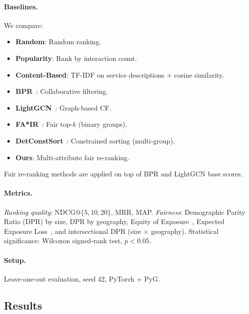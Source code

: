 \documentclass[sigconf,natbib=true]{acmart}
\begin{document}
\paragraph{Baselines.} We compare:
\begin{itemize}
    \item \textbf{Random}: Random ranking.
    \item \textbf{Popularity}: Rank by interaction count.
    \item \textbf{Content-Based}: TF-IDF on service descriptions + cosine similarity.
    \item \textbf{BPR}~\cite{rendle2009bpr}: Collaborative filtering.
    \item \textbf{LightGCN}~\cite{he2020lightgcn}: Graph-based CF.
    \item \textbf{FA*IR}~\cite{zehlike2017fair}: Fair top-$k$ (binary groups).
    \item \textbf{DetConstSort}~\cite{geyik2019fairness}: Constrained sorting (multi-group).
    \item \textbf{Ours}: Multi-attribute fair re-ranking.
\end{itemize}

Fair re-ranking methods are applied on top of BPR and LightGCN base scores.

\paragraph{Metrics.} \emph{Ranking quality}: NDCG@$\{5,10,20\}$, MRR, MAP. \emph{Fairness}: Demographic Parity Ratio (DPR) by size, DPR by geography, Equity of Exposure~\cite{diaz2020evaluating}, Expected Exposure Loss~\cite{singh2018fairness}, and intersectional DPR (size $\times$ geography). Statistical significance: Wilcoxon signed-rank test, $p < 0.05$.

\paragraph{Setup.} Leave-one-out evaluation, seed 42, PyTorch + PyG.

\subsection{Results}
\end{document}
